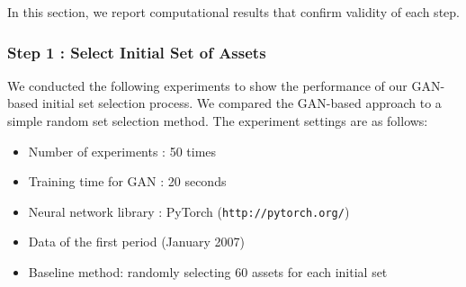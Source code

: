 \documentclass[11pt]{article}
\begin{document}
	In this section, we report computational results that confirm validity of each step. 
	
	
	
	
	\subsubsection{Step 1 : Select Initial Set of Assets }
	
	We conducted the following experiments to show the performance of our GAN-based initial set selection process. We compared the GAN-based approach to a simple random set selection method. The experiment settings are as follows:
	\begin{itemize}
		\item Number of experiments : 50 times
		\item Training time for GAN : 20 seconds
		\item Neural network library : PyTorch (\texttt{http://pytorch.org/})
		\item Data of the first period (January 2007)
		\item Baseline method: randomly selecting 60 assets for each initial set
	\end{itemize}
	
\end{document}
